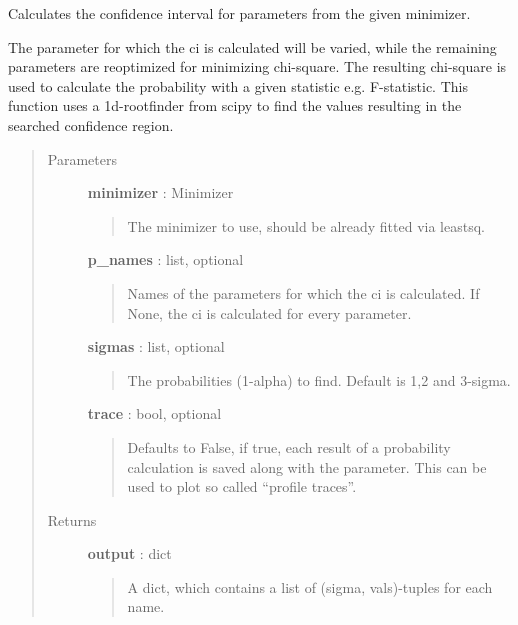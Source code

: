 \documentclass[letterpaper,10pt,english]{sphinxmanual}
\begin{document}
\begin{fulllineitems}
\label{confidence:confidence.conf_interval}
Calculates the confidence interval for parameters
from the given minimizer.

The parameter for which the ci is calculated will be varied, while
the remaining parameters are reoptimized for minimizing chi-square.
The resulting chi-square is used  to calculate the probability with 
a given statistic e.g. F-statistic. This function uses a 1d-rootfinder
from scipy to find the values resulting in the searched confidence
region.
\begin{quote}\begin{description}
\item[{Parameters }] \leavevmode
\textbf{minimizer} : Minimizer
\begin{quote}

The minimizer to use, should be already fitted via leastsq.
\end{quote}

\textbf{p\_names} : list, optional
\begin{quote}

Names of the parameters for which the ci is calculated. If None,
the ci is calculated for every parameter.
\end{quote}

\textbf{sigmas} : list, optional
\begin{quote}

The probabilities (1-alpha) to find. Default is 1,2 and 3-sigma.
\end{quote}

\textbf{trace} : bool, optional
\begin{quote}

Defaults to False, if true, each result of a probability calculation 
is saved along with the parameter. This can be used to plot so
called ``profile traces''.
\end{quote}

\item[{Returns }] \leavevmode
\textbf{output} : dict
\begin{quote}

A dict, which contains a list of (sigma, vals)-tuples for each name.
\end{quote}


\end{description}
\end{quote}
\end{fulllineitems}
\end{document}
